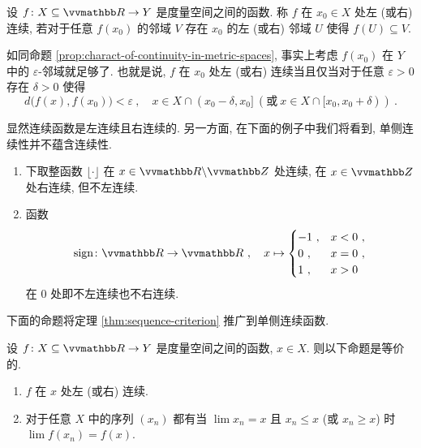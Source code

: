 \begin{definition}[单侧连续性]
    设 \(f \colon X \subseteq \R \to Y\) 是度量空间之间的函数. 称 \(f\) 在 \(x_0 \in X\) 处左 (或右) 连续, 若对于任意 \(f(x_0)\) 的邻域 \(V\) 存在 \(x_0\) 的左 (或右) 邻域 \(U\) 使得 \(f(U) \subseteq V\).
\end{definition}

如同命题 \ref{prop:charact-of-continuity-in-metric-spaces}, 事实上考虑 \(f(x_0)\) 在 \(Y\) 中的 \(\varepsilon\)-邻域就足够了. 也就是说, \(f\) 在 \(x_0\) 处左 (或右) 连续当且仅当对于任意 \(\varepsilon > 0\) 存在 \(\delta > 0\) 使得
\[
    d\bigl(f(x), f(x_0)\bigr) < \varepsilon\ ,\quad x \in X \cap (x_0 - \delta, x_0]\ (\text{或}\ x \in X \cap [x_0, x_0 + \delta))\ .
\]

显然连续函数是左连续且右连续的. 另一方面, 在下面的例子中我们将看到, 单侧连续性并不蕴含连续性.

\begin{example}
    \begin{enumerate}
        \item 下取整函数 \(\lfloor \cdot \rfloor\) 在 \(x \in \R \backslash \Z\) 处连续, 在 \(x \in \Z\) 处右连续, 但不左连续.
        \item 函数
        \[
            \sign \colon \R \to \R\ ,\quad x \mapsto
            \begin{cases}
                - 1\ , & x < 0\ , \\
                0\ ,   & x = 0\ , \\
                1\ ,   & x > 0
            \end{cases}
        \]
        在 \(0\) 处即不左连续也不右连续.
    \end{enumerate}
\end{example}

下面的命题将定理 \ref{thm:sequence-criterion} 推广到单侧连续函数.

\begin{proposition}
    设 \(f \colon X \subseteq \R \to Y\) 是度量空间之间的函数, \(x \in X\). 则以下命题是等价的.
    \begin{enumerate}
        \item \(f\) 在 \(x\) 处左 (或右) 连续.
        \item 对于任意 \(X\) 中的序列 \((x_n)\) 都有当 \(\lim x_n = x\) 且 \(x_n \leq x\) (或 \(x_n \geq x\)) 时 \(\lim f(x_n) = f(x)\).
    \end{enumerate}
\end{proposition}

